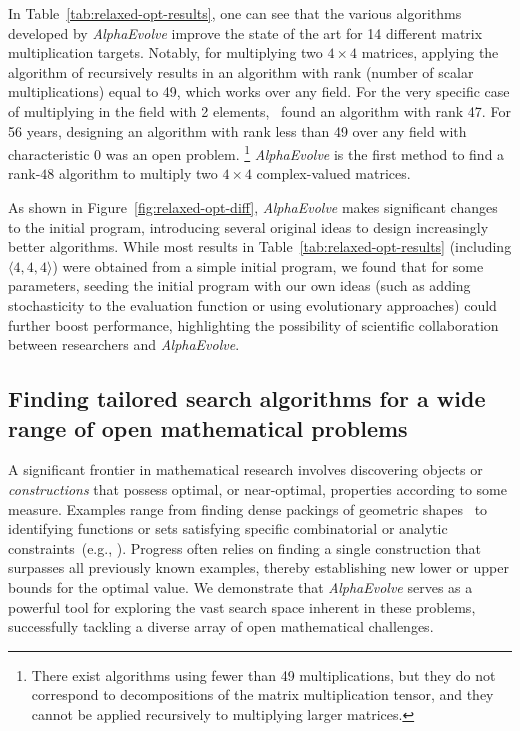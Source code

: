 \documentclass[logo,copyright,12pt]{googledeepmind}
\theoremstyle{definition}
\theoremstyle{remark}
\theoremstyle{plain}
\newcommand{\method}{\emph{AlphaEvolve}\xspace}
\begin{document}


In Table~\ref{tab:relaxed-opt-results}, one can see that the various algorithms developed by \method improve the state of the art for 14 different matrix multiplication targets.
Notably, for multiplying two $4\times 4$ matrices, applying the algorithm of \citet{strassen1969gaussian} recursively results in an algorithm with rank (number of scalar multiplications) equal to 49, which works over any field.
For the very specific case of multiplying in the field with 2 elements,~\citet{fawzi2022discovering} found an algorithm with rank 47.
For 56 years, designing an algorithm with rank less than 49 over any field with characteristic 0 was an open problem.%
\footnote{There exist algorithms using fewer than 49 multiplications, but they do not correspond to decompositions of the matrix multiplication tensor, and they cannot be applied recursively to multiplying larger matrices.\vspace{-1em}}
\method is the first method to find a rank-$48$ algorithm to multiply two $4\times 4$ complex-valued matrices.

As shown in Figure~\ref{fig:relaxed-opt-diff}, \method makes significant changes to the initial program, introducing several original ideas to design increasingly better algorithms.
While most results in Table~\ref{tab:relaxed-opt-results} (including $\langle 4, 4, 4 \rangle$) were obtained from a simple initial program, we found that for some parameters, seeding the initial program with our own ideas (such as adding stochasticity to the evaluation function or using evolutionary approaches) could further boost performance, highlighting the possibility of scientific collaboration between researchers and \method. 


\subsection{Finding tailored search algorithms for a wide range of open mathematical problems}
\label{subsec:math}

A significant frontier in mathematical research involves discovering objects or \textit{constructions} that possess optimal, or near-optimal, properties according to some measure. Examples range from finding dense packings of geometric shapes~\cite{geometry_collection} to identifying functions or sets satisfying specific combinatorial or analytic constraints~(e.g., \cite{matolcsi2010improved, vinuesa2010generalized, haugland2016minimum, gyarmati2007sums}). Progress often relies on finding a single construction that surpasses all previously known examples, thereby establishing new lower or upper bounds for the optimal value. We demonstrate that \method serves as a powerful tool for exploring the vast search space inherent in these problems, successfully tackling a diverse array of open mathematical challenges.
\end{document}

